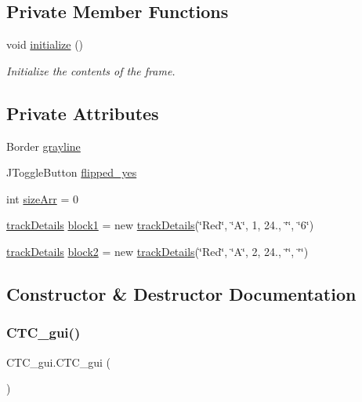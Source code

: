 \subsection*{Private Member Functions}
\begin{DoxyCompactItemize}
\item 
void \hyperlink{classCTC__gui_af8298a2936080671d12fc6c0ca5dd7a3}{initialize} ()
\begin{DoxyCompactList}\small\item\em Initialize the contents of the frame. \end{DoxyCompactList}\end{DoxyCompactItemize}
\subsection*{Private Attributes}
\begin{DoxyCompactItemize}
\item 
Border \hyperlink{classCTC__gui_abc2e3bfbf18d4e85c0ad27a18af06a62}{grayline}
\item 
J\+Toggle\+Button \hyperlink{classCTC__gui_ac1dbe678dae57ea63c6a647b0e6a10df}{flipped\+\_\+yes}
\item 
int \hyperlink{classCTC__gui_a1394f1231e8fda2c6437d072e28d1da2}{size\+Arr} = 0
\item 
\hyperlink{classtrackDetails}{track\+Details} \hyperlink{classCTC__gui_a9f323c3477f61193b3e87c047eed84a7}{block1} = new \hyperlink{classtrackDetails}{track\+Details}(\char`\"{}Red\char`\"{}, \char`\"{}A\char`\"{}, 1, 24., \char`\"{}\char`\"{}, \char`\"{}6\char`\"{})
\item 
\hyperlink{classtrackDetails}{track\+Details} \hyperlink{classCTC__gui_af19fcf01d102c99e349cba43ac13a3a3}{block2} = new \hyperlink{classtrackDetails}{track\+Details}(\char`\"{}Red\char`\"{}, \char`\"{}A\char`\"{}, 2, 24., \char`\"{}\char`\"{}, \char`\"{}\char`\"{})
\end{DoxyCompactItemize}


\subsection{Constructor \& Destructor Documentation}
\mbox{\label{classCTC__gui_a2e77261492fe815cec81ff396aaeb5f9}} 
\subsubsection{\texorpdfstring{C\+T\+C\+\_\+gui()}{CTC\_gui()}}
{\footnotesize\ttfamily C\+T\+C\+\_\+gui.\+C\+T\+C\+\_\+gui (\begin{DoxyParamCaption}{ }\end{DoxyParamCaption})}



